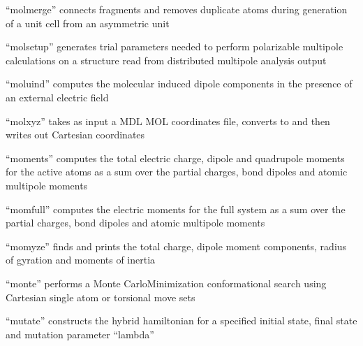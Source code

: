 \documentclass[letterpaper,11pt,english]{sphinxmanual}
\begin{document}
\sphinxAtStartPar
{}

\sphinxAtStartPar
“molmerge” connects fragments and removes duplicate atoms during generation of a unit cell from an asymmetric unit

\sphinxAtStartPar
{}

\sphinxAtStartPar
“molsetup” generates trial parameters needed to perform polarizable multipole calculations on a structure read from distributed multipole analysis output

\sphinxAtStartPar
{}

\sphinxAtStartPar
“moluind” computes the molecular induced dipole components in the presence of an external electric field

\sphinxAtStartPar
{}

\sphinxAtStartPar
“molxyz” takes as input a MDL MOL coordinates file, converts to and then writes out Cartesian coordinates

\sphinxAtStartPar
{}

\sphinxAtStartPar
“moments” computes the total electric charge, dipole and quadrupole moments for the active atoms as a sum over the partial charges, bond dipoles and atomic multipole moments

\sphinxAtStartPar
{}

\sphinxAtStartPar
“momfull” computes the electric moments for the full system as a sum over the partial charges, bond dipoles and atomic multipole moments

\sphinxAtStartPar
{}

\sphinxAtStartPar
“momyze” finds and prints the total charge, dipole moment components, radius of gyration and moments of inertia

\sphinxAtStartPar
{}

\sphinxAtStartPar
“monte” performs a Monte Carlo\sphinxhyphen{}Minimization conformational search using Cartesian single atom or torsional move sets

\sphinxAtStartPar
{}

\sphinxAtStartPar
“mutate” constructs the hybrid hamiltonian for a specified initial state, final state and mutation parameter “lambda”

\sphinxAtStartPar
{}
\end{document}
